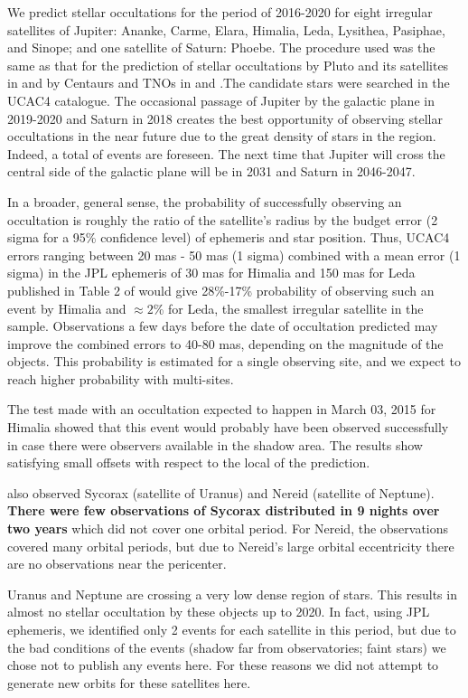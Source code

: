 \documentclass[useAMS,usenatbib]{mn2e}
\begin{document}
We predict stellar occultations for the period of 2016-2020 for eight irregular satellites of Jupiter: Ananke, Carme, Elara, Himalia, Leda, Lysithea, Pasiphae, and Sinope; and one satellite of Saturn: Phoebe. The procedure used was the same as that for the prediction of stellar occultations by Pluto and its satellites in \cite{Assafin2010} and by Centaurs and TNOs in \cite{Assafin2012} and \cite{Camargo2014}.The candidate stars were searched in the UCAC4 catalogue. The occasional passage of Jupiter by the galactic plane in 2019-2020 and Saturn in 2018 creates the best opportunity of observing stellar occultations in the near future due to the great density of stars in the region. Indeed, a total of \noccs events are foreseen. The next time that Jupiter will cross the central side of the galactic plane will be in 2031 and Saturn in 2046-2047.

In a broader, general sense, the probability of successfully observing an occultation is roughly the ratio of the satellite's radius by the budget error (2 sigma for a 95\% confidence level) of ephemeris and star position. Thus, UCAC4 errors ranging between 20 mas - 50 mas (1 sigma) combined with a mean error (1 sigma) in the JPL ephemeris of 30 mas for Himalia and 150 mas for Leda published in Table 2 of \cite{Jacobson2012} would give 28\%-17\% probability of observing such an event by Himalia and $\approx2$\% for Leda, the smallest irregular satellite in the sample. Observations a few days before the date of occultation predicted may improve the combined errors to 40-80 mas, depending on the magnitude of the objects. This probability is estimated for a single observing site, and we expect to reach higher probability with multi-sites.

The test made with an occultation expected to happen in March 03, 2015 for Himalia showed that this event would probably have been observed successfully in case there were observers available in the shadow area. The results show satisfying small offsets with respect to the local of the prediction.

 also observed Sycorax (satellite of Uranus) and Nereid (satellite of Neptune). \textbf{There were few observations of Sycorax distributed in 9 nights over two years} which did not cover one orbital period. For Nereid, the observations covered many orbital periods, but due to Nereid's large orbital eccentricity there are no observations near the pericenter.

Uranus and Neptune are crossing a very low dense region of stars. This results in almost no stellar occultation by these objects up to 2020. In fact, using JPL ephemeris, we identified only 2 events for each satellite in this period, but due to the bad conditions of the events (shadow far from observatories; faint stars) we chose not to publish any events here.  For these reasons we did not attempt to generate new orbits for these satellites here.
\end{document}
